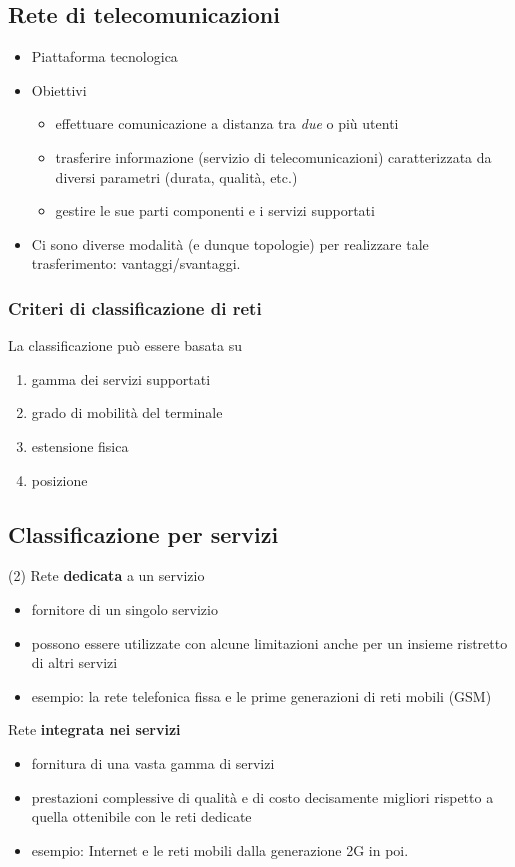 \documentclass{book}
\begin{document}
\subsection{Rete di telecomunicazioni}
\begin{itemize}
	\item Piattaforma tecnologica
	\item Obiettivi
		\begin{itemize}
			\item effettuare comunicazione a distanza tra \textit{due} o più
				utenti
			\item trasferire informazione (servizio di telecomunicazioni)
				caratterizzata da diversi parametri (durata, qualità, etc.)
			\item gestire le sue parti componenti e i servizi supportati
		\end{itemize}
	\item Ci sono diverse modalità (e dunque topologie) per realizzare tale
		trasferimento: vantaggi/svantaggi.
\end{itemize}
\subsubsection{Criteri di classificazione di reti}
La classificazione può essere basata su
\begin{enumerate}
	\item gamma dei servizi supportati
	\item grado di mobilità del terminale
	\item estensione fisica
	\item posizione
\end{enumerate}
\subsection{Classificazione per servizi}
\begin{tasks}(2)
	\task Rete \textbf{dedicata} a un servizio
	\begin{itemize}
		\item fornitore di un singolo servizio
		\item possono essere utilizzate con alcune limitazioni anche per un
			insieme ristretto di altri servizi
		\item esempio: la rete telefonica fissa e le prime generazioni di reti
			mobili (GSM)
	\end{itemize}
	\task Rete \textbf{integrata nei servizi}
	\begin{itemize}
		\item fornitura di una vasta gamma di servizi
		\item prestazioni complessive di qualità e di costo decisamente
			migliori rispetto a quella ottenibile con le reti dedicate
		\item esempio: Internet e le reti mobili dalla generazione 2G in poi.
	\end{itemize}
\end{tasks}
\end{document}
